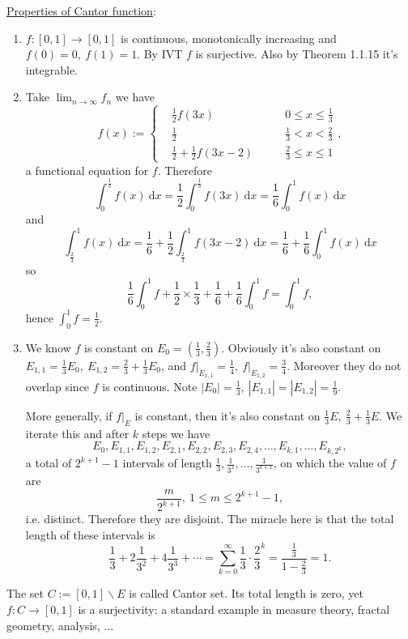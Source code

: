 \documentclass[a4paper]{article}
\theoremstyle{definition}
\begin{document}
\underline{Properties of Cantor function}:
\begin{enumerate}
    \item $f:[0,1]\rightarrow [0,1]$ is continuous, monotonically increasing and $f(0)=0,\ f(1)=1$. By IVT $f$ is surjective. Also by Theorem 1.1.15 it's integrable.
    \item Take $\lim_{n\rightarrow \infty} f_n$ we have
    \[
    f(x) := \left\{\begin{aligned}&\frac12 f (3x) \qquad &0\leq x \leq \frac13 \\ &\frac12 \qquad &\frac13 <x < \frac23 \\ &\frac12 + \frac12 f(3x-2) \qquad &\frac23 \leq x \leq 1\end{aligned} \right. ,
    \]
    a functional equation for $f$. Therefore
    \[
    \int_0^\frac13 f(x) \ \mathrm d x = \frac12 \int_0^\frac13 f(3x) \ \mathrm d x = \frac16 \int_0^1 f(x) \ \mathrm d x
    \]
    and
    \[
    \int_\frac23^1 f(x) \ \mathrm d x = \frac16 + \frac12 \int_\frac23^1 f(3x-2) \ \mathrm d x = \frac16 +\frac16 \int_0^1 f(x) \ \mathrm d x
    \]
    so
    \[
    \frac16 \int_0^1 f + \frac12 \times \frac13+\frac16+\frac16\int_0^1 f=\int_0^1 f,
    \]
    hence $\int_0^1 f = \frac12$.
    \item We know $f$ is constant on $E_0=\left(\frac13,\frac23 \right).$ Obviously it's also constant on $E_{1,1}=\frac13 E_0,\ E_{1,2}=\frac23+\frac13 E_0$, and $\left.f\right|_{E_{1,1}}=\frac14,\ \left.f\right|_{E_{1,2}}=\frac34$. Moreover they do not overlap since $f$ is continuous. Note $|E_0|=\frac13,\ |E_{1,1}|=|E_{1,2}|=\frac19$.
    
    More generally, if $\left.f\right|_E$ is constant, then it's also constant on $\frac13 E,\ \frac23+\frac13 E$. We iterate this and after $k$ steps we have 
    \[
    E_0,E_{1,1},E_{1,2},E_{2,1},E_{2,2},E_{2,3},E_{2,4},\ldots,E_{k,1},\ldots,E_{k,2^k},
    \]
    a total of $2^{k+1}-1$ intervals of length $\frac13,\frac{1}{3^2},\ldots,\frac{1}{3^{k+1}}$, on which the value of $f$ are
    \[
    \frac{m}{2^{k+1}},\ 1\leq m\leq 2^{k+1}-1,
    \]
    i.e. distinct. Therefore they are disjoint. The miracle here is that the total length of these intervals is
    \[
    \frac13+2\frac{1}{3^2}+4\frac{1}{3^3}+\cdots =\sum_{k=0}^\infty \frac13\cdot \frac{2}{3}^k =\frac{\frac13}{1-\frac23} =1.
    \]
\end{enumerate}
The set $C:=[0,1]\backslash E$ is called Cantor set. Its total length is zero, yet $f:C\rightarrow [0,1]$ is a surjectivity: a standard example in measure theory, fractal geometry, analysis, ...
\end{document}
